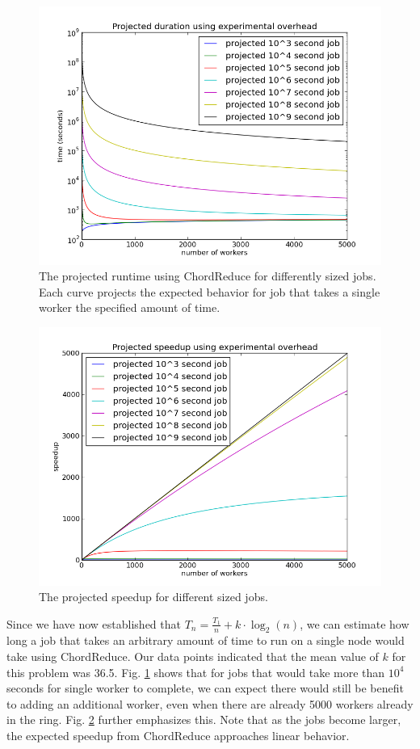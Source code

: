\begin{figure}
    \includegraphics[width=\linewidth]{projTime}
    \caption{The projected runtime using ChordReduce for differently sized jobs.  Each curve projects the expected behavior for job that takes a single worker the specified amount of time.}
    \label{projTime}
\end{figure}

\begin{figure}
    \includegraphics[width=\linewidth]{projSpeed}
    \caption{The projected speedup for different sized jobs. }
    \label{projSpeed}
\end{figure}

Since we have now established that $T_{n} = \frac{T_{1}}{n} + k \cdot \log_{2}(n)$, we can estimate how long a job that takes an arbitrary amount of time to run on a single node would take using ChordReduce.  Our data points indicated that the mean value of $k$ for this problem was 36.5.  Fig. \ref{projTime} shows that for jobs that would take more than $10^{4}$ seconds for single worker to complete, we can expect there would still be benefit to adding an additional worker, even when there are already 5000 workers already in the ring.  Fig. \ref{projSpeed} further emphasizes this. Note that as the jobs become larger, the expected speedup from ChordReduce  approaches linear behavior.


